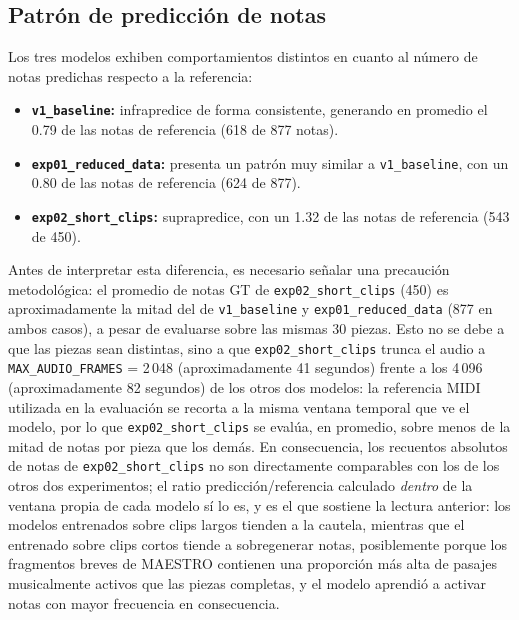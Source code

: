 \subsection{Patrón de predicción de notas}

Los tres modelos exhiben comportamientos distintos en cuanto al
número de notas predichas respecto a la referencia:

\begin{itemize}
    \item \textbf{\texttt{v1\_baseline}:} infrapredice de forma
    consistente, generando en promedio el 0.79 de las notas de
    referencia (618 de 877 notas).
    \item \textbf{\texttt{exp01\_reduced\_data}:} presenta un patrón
    muy similar a \texttt{v1\_baseline}, con un 0.80 de las notas de
    referencia (624 de 877).
    \item \textbf{\texttt{exp02\_short\_clips}:} suprapredice, con un
    1.32 de las notas de referencia (543 de 450).
\end{itemize}

Antes de interpretar esta diferencia, es necesario señalar una
precaución metodológica: el promedio de notas GT de
\texttt{exp02\_short\_clips} (450) es aproximadamente la mitad del de
\texttt{v1\_baseline} y \texttt{exp01\_reduced\_data} (877 en ambos
casos), a pesar de evaluarse sobre las mismas 30 piezas. Esto no se
debe a que las piezas sean distintas, sino a que
\texttt{exp02\_short\_clips} trunca el audio a
\texttt{MAX\_AUDIO\_FRAMES} = 2\,048 (aproximadamente 41 segundos)
frente a los 4\,096 (aproximadamente 82 segundos) de los otros dos
modelos: la referencia MIDI utilizada en la evaluación se recorta a
la misma ventana temporal que ve el modelo, por lo que
\texttt{exp02\_short\_clips} se evalúa, en promedio, sobre menos de la
mitad de notas por pieza que los demás. En consecuencia, los recuentos
absolutos de notas de \texttt{exp02\_short\_clips} no son directamente
comparables con los de los otros dos experimentos; el ratio
predicción/referencia calculado \emph{dentro} de la ventana propia de
cada modelo sí lo es, y es el que sostiene la lectura anterior: los
modelos entrenados sobre clips largos tienden a la cautela, mientras
que el entrenado sobre clips cortos tiende a sobregenerar notas,
posiblemente porque los fragmentos breves de MAESTRO contienen una
proporción más alta de pasajes musicalmente activos que las piezas
completas, y el modelo aprendió a activar notas con mayor frecuencia
en consecuencia.

